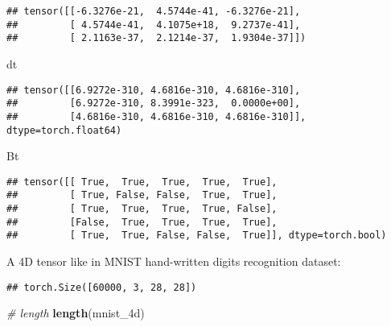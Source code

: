 \documentclass[]{book}
\newenvironment{Shaded}{\begin{snugshade}}{\end{snugshade}}
\newcommand{\CommentTok}[1]{\textcolor[rgb]{0.56,0.35,0.01}{\textit{#1}}}
\newcommand{\KeywordTok}[1]{\textcolor[rgb]{0.13,0.29,0.53}{\textbf{#1}}}
\newcommand{\NormalTok}[1]{#1}
\newcommand{\OperatorTok}[1]{\textcolor[rgb]{0.81,0.36,0.00}{\textbf{#1}}}
\newcommand{\StringTok}[1]{\textcolor[rgb]{0.31,0.60,0.02}{#1}}
\begin{document}
\begin{verbatim}
## tensor([[-6.3276e-21,  4.5744e-41, -6.3276e-21],
##         [ 4.5744e-41,  4.1075e+18,  9.2737e-41],
##         [ 2.1163e-37,  2.1214e-37,  1.9304e-37]])
\end{verbatim}

\begin{Shaded}
\begin{Highlighting}[]
\NormalTok{dt}
\end{Highlighting}
\end{Shaded}

\begin{verbatim}
## tensor([[6.9272e-310, 4.6816e-310, 4.6816e-310],
##         [6.9272e-310, 8.3991e-323,  0.0000e+00],
##         [4.6816e-310, 4.6816e-310, 4.6816e-310]], dtype=torch.float64)
\end{verbatim}

\begin{Shaded}
\begin{Highlighting}[]
\NormalTok{Bt}
\end{Highlighting}
\end{Shaded}

\begin{verbatim}
## tensor([[ True,  True,  True,  True,  True],
##         [ True, False, False,  True,  True],
##         [ True,  True,  True,  True, False],
##         [False,  True,  True,  True,  True],
##         [ True,  True, False, False,  True]], dtype=torch.bool)
\end{verbatim}

A 4D tensor like in MNIST hand-written digits recognition dataset:

\begin{Shaded}
\end{Shaded}

\begin{verbatim}
## torch.Size([60000, 3, 28, 28])
\end{verbatim}

\begin{Shaded}
\begin{Highlighting}[]
\CommentTok{# length}
\KeywordTok{length}\NormalTok{(mnist_4d)}
\end{Highlighting}
\end{Shaded}
\end{document}

